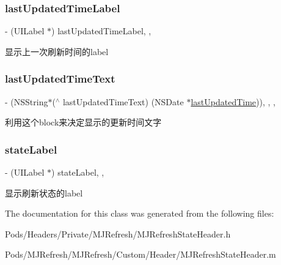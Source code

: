 \subsubsection{\texorpdfstring{last\+Updated\+Time\+Label}{lastUpdatedTimeLabel}}
{\footnotesize\ttfamily -\/ (U\+I\+Label $\ast$) last\+Updated\+Time\+Label\hspace{0.3cm}{\ttfamily [read]}, {\ttfamily [nonatomic]}, {\ttfamily [weak]}}

显示上一次刷新时间的label \mbox{\label{interface_m_j_refresh_state_header_adcc7f1db9e3dfe287d52dc71af3e2ad1}} 
\subsubsection{\texorpdfstring{last\+Updated\+Time\+Text}{lastUpdatedTimeText}}
{\footnotesize\ttfamily -\/ (N\+S\+String$\ast$($^\wedge$ last\+Updated\+Time\+Text) (N\+S\+Date $\ast$\mbox{\hyperlink{interface_m_j_refresh_header_ad673d647b3f6bbb11230437a7e739c3a}{last\+Updated\+Time}}))\hspace{0.3cm}{\ttfamily [read]}, {\ttfamily [write]}, {\ttfamily [nonatomic]}, {\ttfamily [copy]}}

利用这个block来决定显示的更新时间文字 \mbox{\label{interface_m_j_refresh_state_header_a8b6b4132d5bd1f0f197766ff0b6eb883}} 
\subsubsection{\texorpdfstring{state\+Label}{stateLabel}}
{\footnotesize\ttfamily -\/ (U\+I\+Label $\ast$) state\+Label\hspace{0.3cm}{\ttfamily [read]}, {\ttfamily [nonatomic]}, {\ttfamily [weak]}}

显示刷新状态的label 

The documentation for this class was generated from the following files\+:\begin{DoxyCompactItemize}
\item 
Pods/\+Headers/\+Private/\+M\+J\+Refresh/M\+J\+Refresh\+State\+Header.\+h\item 
Pods/\+M\+J\+Refresh/\+M\+J\+Refresh/\+Custom/\+Header/M\+J\+Refresh\+State\+Header.\+m\end{DoxyCompactItemize}
